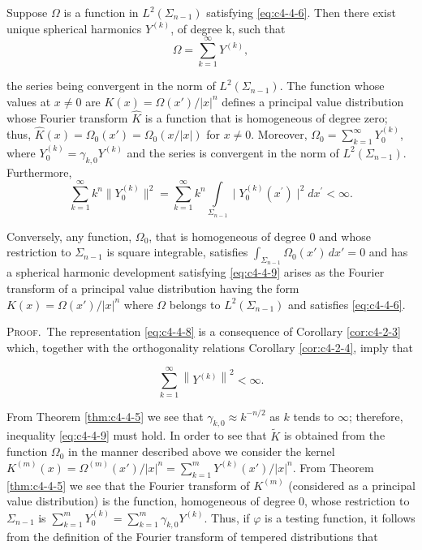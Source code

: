 \begin{theorem}
\label{thm:c4-4-7}
Suppose $\Omega$ is a function in $L^2(\Sigma_{n-1})$ satisfying \eqref{eq:c4-4-6}. Then there exist unique spherical harmonics $Y^{(k)}$, of degree k, such that
\begin{equation}\label{eq:c4-4-8}
\Omega=\sum_{k=1}^{\infty}Y^{(k)},
\end{equation}

the series being convergent in the norm of $L^{2}(\Sigma_{n-1})$. The function whose values at $x \neq 0$ are $K(x) = \Omega(x')/|x|^{n}$ defines a principal value distribution whose Fourier transform $\hat{K}$ is a function that is homogeneous of degree zero; thus, $\hat{K}(x) = \Omega_0(x') = \Omega_0(x/|x|)$ for $x \neq 0$. Moreover, $\Omega_0 = \sum_{k=1}^{\infty} Y_0^{(k)}$, where $Y_0^{(k)} = \gamma_{k,0} Y^{(k)}$ and the series is convergent in the norm of $L^{2}(\Sigma_{n-1})$. Furthermore,
\begin{equation}\label{eq:c4-4-9}
\sum_{k=1}^{\infty}k^{n}\|Y_{0}^{(k)}\|^{2}=\sum_{k=1}^{\infty}k^{n}\int\limits_{\Sigma_{n-1}}\mid Y_{0}^{(k)}(x^{\prime})\mid^{2}d x^{\prime}<\infty.
\end{equation}

\end{theorem}

Conversely, any function, $\Omega_0$, that is homogeneous of degree 0 and whose restriction to $\Sigma_{n-1}$ is square integrable, satisfies $\int_{\Sigma_{n-1}} \Omega_0(x') \, dx' = 0$ and has a spherical harmonic development satisfying \eqref{eq:c4-4-9} arises as the Fourier transform of a principal value distribution having the form $K(x) = \Omega(x') / |x|^n$ where $\Omega$ belongs to $L^2(\Sigma_{n-1})$ and satisfies \eqref{eq:c4-4-6}.

\textsc{Proof.}\ The representation \eqref{eq:c4-4-8} is a consequence of Corollary \ref{cor:c4-2-3} which, together with the orthogonality relations Corollary \ref{cor:c4-2-4}, imply that

\[
\sum_{k=1}^{\infty}\left\|Y^{(k)}\right\|^{2}<\infty.
\]

From Theorem \ref{thm:c4-4-5} we see that $\gamma_{k,0} \approx k^{-n/2}$ as $k$ tends to $\infty$; therefore, inequality \eqref{eq:c4-4-9} must hold. In order to see that $\tilde{K}$ is obtained from the function $\Omega_0$ in the manner described above we consider the kernel $K^{(m)}(x) = \Omega^{(m)}(x') / |x|^n = \sum_{k=1}^m Y^{(k)}(x') / |x|^n$. From Theorem \ref{thm:c4-4-5} we see that the Fourier transform of $K^{(m)}$ (considered as a principal value distribution) is the function, homogeneous of degree 0, whose restriction to $\Sigma_{n-1}$ is $\sum_{k=1}^m Y_0^{(k)} = \sum_{k=1}^m \gamma_{k,0} Y^{(k)}$. Thus, if $\varphi$ is a testing function, it follows from the definition of the Fourier transform of tempered distributions that

